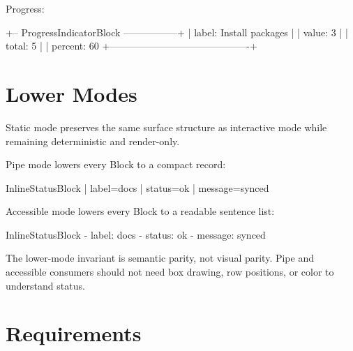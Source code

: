 Progress:

\begin{CodeBlock}
+-- ProgressIndicatorBlock -----------------+
| label: Install packages                   |
| value: 3                                  |
| total: 5                                  |
| percent: 60%
+-------------------------------------------+
\end{CodeBlock}

\section{Lower Modes}\label{record-092-lower-modes}

Static mode preserves the same surface structure as interactive mode while remaining deterministic and render-only.

Pipe mode lowers every Block to a compact record:

\begin{CodeBlock}
InlineStatusBlock | label=docs | status=ok | message=synced
\end{CodeBlock}

Accessible mode lowers every Block to a readable sentence list:

\begin{CodeBlock}
InlineStatusBlock
- label: docs
- status: ok
- message: synced
\end{CodeBlock}

The lower-mode invariant is semantic parity, not visual parity. Pipe and accessible consumers should not need box drawing, row positions, or color to understand status.

\section{Requirements}\label{record-092-requirements}


